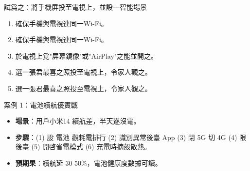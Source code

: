 \begin{tcbpractice}{試爲之：將手機屏投至電視上，並設一智能場景}
\begin{enumerate}
  \item 確保手機與電視連同一Wi-Fi。
  \item 確保手機與電視連同一Wi-Fi。
  \item 於電視上覓"屏幕鏡像"或"AirPlay"之能並開之。
  \item 選一張君最喜之照投至電視上，令家人觀之。
  \item 選一張君最喜之照投至電視上，令家人觀之。
\end{enumerate}

\end{tcbpractice}

\begin{tcbinfo}{案例 1：電池續航優實戰}
\begin{itemize}
  \item \textbf{場景}：用戶小米14 續航差，半天遂沒電。
  \item \textbf{步驟}：(1) 設 電池 觀耗電排行 (2) 識別異常後臺 App (3) 閉 5G 切 4G (4) 限後臺 (5) 開啓省電模式 (6) 充電時摘殼散熱。
  \item \textbf{預期果}：續航延 30-50\%，電池健康度數據可讀。
\end{itemize}

\end{tcbinfo}
